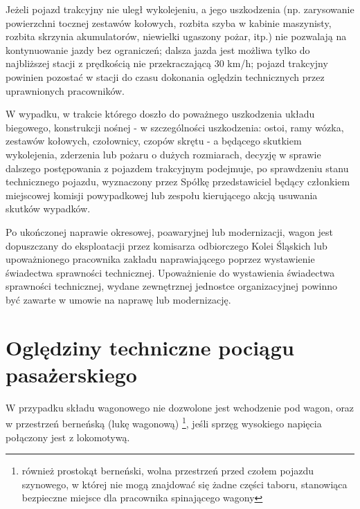 Jeżeli pojazd trakcyjny nie uległ wykolejeniu, a jego uszkodzenia (np. zarysowanie powierzchni tocznej zestawów kołowych, rozbita szyba w kabinie maszynisty, rozbita skrzynia akumulatorów, niewielki ugaszony pożar, itp.) nie pozwalają na kontynuowanie jazdy bez ograniczeń; dalsza jazda jest możliwa tylko do najbliższej stacji z prędkością nie przekraczającą 30 km/h; pojazd trakcyjny powinien pozostać w stacji do czasu dokonania oględzin technicznych przez uprawnionych pracowników.

W wypadku, w trakcie którego doszło do poważnego uszkodzenia układu biegowego, konstrukcji nośnej - w szczególności uszkodzenia: ostoi, ramy wózka,
zestawów kołowych, czołownicy, czopów skrętu - a będącego skutkiem wykolejenia, zderzenia lub pożaru o dużych rozmiarach, decyzję w sprawie dalszego postępowania z pojazdem trakcyjnym podejmuje, po sprawdzeniu stanu technicznego pojazdu, wyznaczony przez Spółkę przedstawiciel będący członkiem miejscowej komisji powypadkowej lub zespołu kierującego akcją usuwania skutków wypadków.

Po ukończonej naprawie okresowej, poawaryjnej lub modernizacji, wagon jest dopuszczany do eksploatacji przez komisarza odbiorczego Kolei Śląskich lub upoważnionego pracownika zakładu naprawiającego poprzez wystawienie świadectwa sprawności technicznej. Upoważnienie do wystawienia świadectwa sprawności technicznej, wydane zewnętrznej jednostce organizacyjnej powinno być zawarte w umowie na naprawę lub modernizację.

\chapter{Oględziny techniczne pociągu pasażerskiego}

W przypadku składu wagonowego nie dozwolone jest wchodzenie pod wagon, oraz w przestrzeń berneńską (lukę wagonową) \footnote{również prostokąt berneński, wolna przestrzeń przed czołem pojazdu szynowego, w której nie mogą znajdować się żadne części taboru, stanowiąca bezpieczne miejsce dla pracownika spinającego wagony}, jeśli sprzęg wysokiego napięcia połączony jest z lokomotywą. 

